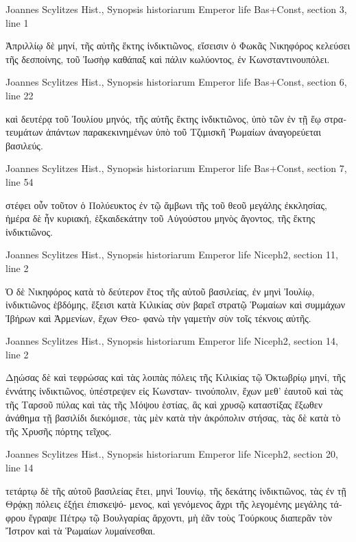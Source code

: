 \documentclass[12pt,letterpaper,twoside,final]{memoir}
\begin{document}
\begin{greek}
Joannes Scylitzes Hist., Synopsis historiarum 
Emperor life Bas+Const, section 3, line 1

Ἀπριλλίῳ δὲ μηνί, τῆς αὐτῆς ἕκτης ἰνδικτιῶνος, εἴσεισιν ὁ Φωκᾶς 
Νικηφόρος κελεύσει τῆς δεσποίνης, τοῦ Ἰωσὴφ καθάπαξ καὶ πάλιν 
κωλύοντος, ἐν Κωνσταντινουπόλει. 



Joannes Scylitzes Hist., Synopsis historiarum 
Emperor life Bas+Const, section 6, line 22

             καὶ δευτέρᾳ τοῦ Ἰουλίου μηνός, τῆς αὐτῆς ἕκτης ἰνδικτιῶνος, 
ὑπὸ τῶν ἐν τῇ ἕῳ στρατευμάτων ἁπάντων παρακεκινημένων ὑπὸ τοῦ 
Τζιμισκῆ Ῥωμαίων ἀναγορεύεται βασιλεύς. 



Joannes Scylitzes Hist., Synopsis historiarum 
Emperor life Bas+Const, section 7, line 54

            στέφει οὖν τοῦτον ὁ Πολύευκτος ἐν τῷ ἄμβωνι τῆς τοῦ θεοῦ 
μεγάλης ἐκκλησίας, ἡμέρα δὲ ἦν κυριακή, ἑξκαιδεκάτην τοῦ Αὐγούστου 
μηνὸς ἄγοντος, τῆς ἕκτης ἰνδικτιῶνος. 



Joannes Scylitzes Hist., Synopsis historiarum 
Emperor life Niceph2, section 11, line 2

Ὁ δὲ Νικηφόρος κατὰ τὸ δεύτερον ἔτος τῆς αὐτοῦ βασιλείας, 
ἐν μηνὶ Ἰουλίῳ, ἰνδικτιῶνος ἑβδόμης, ἔξεισι κατὰ Κιλικίας σὺν βαρεῖ 
στρατῷ Ῥωμαίων καὶ συμμάχων Ἰβήρων καὶ Ἀρμενίων, ἔχων Θεο-
φανὼ τὴν γαμετὴν σὺν τοῖς τέκνοις αὐτῆς. 



Joannes Scylitzes Hist., Synopsis historiarum 
Emperor life Niceph2, section 14, line 2

Δῃώσας δὲ καὶ τεφρώσας καὶ τὰς λοιπὰς πόλεις τῆς Κιλικίας 
τῷ Ὀκτωβρίῳ μηνί, τῆς ἐννάτης ἰνδικτιῶνος, ὑπέστρεψεν εἰς Κωνσταν-
τινούπολιν, ἔχων μεθ' ἑαυτοῦ καὶ τὰς τῆς Ταρσοῦ πύλας καὶ τὰς τῆς 
Μόψου ἑστίας, ἃς καὶ χρυσῷ καταστίξας ἔξωθεν ἀνάθημα τῇ βασιλίδι 
διεκόμισε, τὰς μὲν κατὰ τὴν ἀκρόπολιν στήσας, τὰς δὲ κατὰ τὸ τῆς 
Χρυσῆς πόρτης τεῖχος. 



Joannes Scylitzes Hist., Synopsis historiarum 
Emperor life Niceph2, section 20, line 14

                               τετάρτῳ δὲ τῆς αὐτοῦ βασιλείας ἔτει, μηνὶ 
Ἰουνίῳ, τῆς δεκάτης ἰνδικτιῶνος, τὰς ἐν τῇ Θρᾴκῃ πόλεις ἐξῄει ἐπισκεψό-  
μενος, καὶ γενόμενος ἄχρι τῆς λεγομένης μεγάλης τάφρου ἔγραψε Πέτρῳ 
τῷ Βουλγαρίας ἄρχοντι, μὴ ἐᾶν τοὺς Τούρκους διαπερᾶν τὸν Ἴστρον 
καὶ τὰ Ῥωμαίων λυμαίνεσθαι. 




\end{greek}
\end{document}
